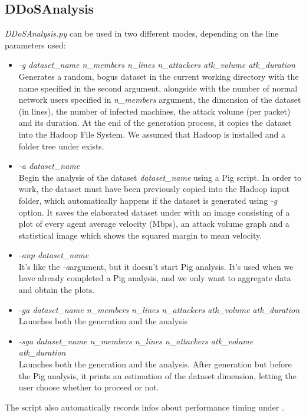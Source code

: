 \subsection{DDoSAnalysis}
\textit{DDoSAnalysis.py} can be used in two different modes, depending on the line parameters used: 
	\begin{itemize}
		\item \textit{-g dataset\_name n\_members n\_lines n\_attackers atk\_volume atk\_duration} \\Generates a random, bogus dataset in the current working directory with the name specified in the second argument, alongside with the number of normal network users specified in \textit{n\_members} argument, the dimension of the dataset (in lines), the number of infected machines, the attack volume (per packet) and its duration. At the end of the generation process, it copies the dataset into the Hadoop File System. We assumed that Hadoop is installed and a folder tree under  exists.
		\item \textit{-a dataset\_name} \\ Begin the analysis of the dataset \textit{dataset\_name} using a Pig script. In order to work, the dataset must have been previously copied into the Hadoop input folder, which automatically happens if the dataset is generated using \textit{-g} option. It saves the elaborated dataset under  with an image consisting of a plot of every agent average velocity (Mbps), an attack volume graph and a statistical image which shows the squared margin to mean velocity.
		\item \textit{-anp dataset\_name} \\ It's like the \textit{-a}argument, but it doesn't start Pig analysis. It's used when we have already completed a Pig analysis, and we only want to aggregate data and obtain the plots. 
		\item \textit{-ga dataset\_name n\_members n\_lines n\_attackers atk\_volume atk\_duration} \\ Launches both the generation and the analysis
		\item \textit{-sga dataset\_name n\_members n\_lines n\_attackers atk\_volume atk\_duration} \\ Launches both the generation and the analysis. After generation but before the Pig analysis, it prints an estimation of the dataset dimension, letting the user choose whether to proceed or not.
	\end{itemize}
The script also automatically records infos about performance timing under .

